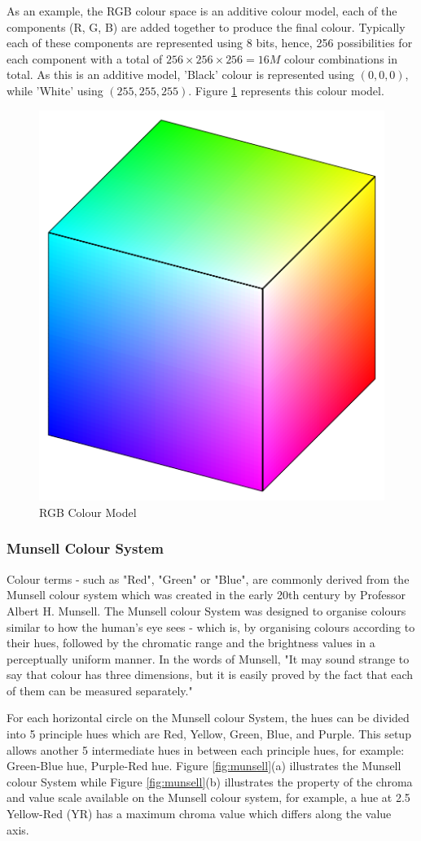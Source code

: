 As an example, the RGB colour space is an additive colour model, each of the
components (R, G, B) are added together to produce the final colour. Typically
each of these components are represented using 8 bits, hence, 256 possibilities
for each component with a total of $256 \times 256 \times 256 = 16M$ colour
combinations in total. As this is an additive model, 'Black' colour is
represented using $(0, 0, 0)$, while 'White' using $(255, 255, 255)$. Figure
\ref{fig:rgb} represents this colour model.

\begin{figure}[hbt!]
 \centering
 \includegraphics[width=.4\textwidth]{image/lit/rgbcolor.jpg}
 \caption{RGB Colour Model}
\label{fig:rgb}
\end{figure}


\subsubsection{Munsell Colour System}
\label{section:munsellcs}
Colour terms - such as "Red", "Green" or "Blue", are commonly derived from
the Munsell colour system which was created in the early 20th century by
Professor Albert H. Munsell. The Munsell colour System was designed to
organise colours similar to how the human's eye sees - which is, by
organising colours according to their hues, followed by the chromatic range
and the brightness values in a perceptually uniform manner. In the words of
Munsell, "It may sound strange to say that colour has three dimensions, but it
is easily proved by the fact that each of them can be measured separately."

For each horizontal circle on the Munsell colour System, the hues can be divided
into 5 principle hues which are Red, Yellow, Green, Blue, and Purple. This setup
allows another 5 intermediate hues in between each principle hues, for example:
Green-Blue hue, Purple-Red hue. Figure \ref{fig:munsell}(a) illustrates the
Munsell colour System while Figure \ref{fig:munsell}(b) illustrates the property
of the chroma and value scale available on the Munsell colour system, for
example, a hue at 2.5 Yellow-Red (YR) has a maximum chroma value which differs
along the value axis.



